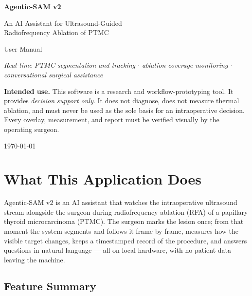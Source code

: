 \documentclass[11pt,a4paper]{article}
\begin{document}
\begin{titlepage}
\centering
\vspace*{3cm}
{\Huge\bfseries\color{asamblue} Agentic-SAM v2\par}
\vspace{0.6cm}
{\LARGE An AI Assistant for Ultrasound-Guided\\[0.2cm] Radiofrequency Ablation of PTMC\par}
\vspace{1.2cm}
{\large User Manual\par}
\vspace{2cm}
{\large\itshape Real-time PTMC segmentation and tracking $\cdot$ ablation-coverage
monitoring $\cdot$ conversational surgical assistance\par}
\vfill
\begin{warnbox}
\textbf{Intended use.} This software is a research and workflow-prototyping tool.
It provides \emph{decision support only}. It does not diagnose, does not measure
thermal ablation, and must never be used as the sole basis for an
intraoperative decision. Every overlay, measurement, and report must be
verified visually by the operating surgeon.
\end{warnbox}
\vspace{1cm}
{\large\today\par}
\end{titlepage}

\tableofcontents
\newpage

\section{What This Application Does}

Agentic-SAM v2 is an AI assistant that watches the intraoperative ultrasound
stream alongside the surgeon during radiofrequency ablation (RFA) of a
papillary thyroid microcarcinoma (PTMC). The surgeon marks the lesion once;
from that moment the system segments and follows it frame by frame, measures
how the visible target changes, keeps a timestamped record of the procedure,
and answers questions in natural language --- all on local hardware, with no
patient data leaving the machine.

\subsection{Feature Summary}
\end{document}
